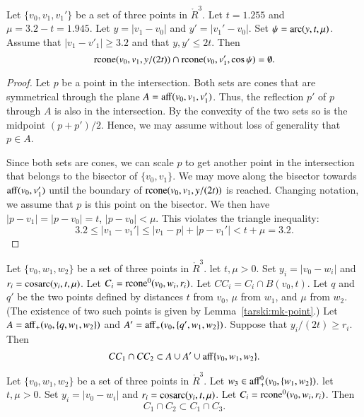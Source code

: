 \newpage


\begin{lemma}\label{tarski:2CCrad}
Let $\{v_0,v_1,v_1'\}$ be a set of three points in $\ring{R}^3$.
Let $t=1.255$ and 
$\mu = 3.2 - t = 1.945$.  Let $y = |v_1-v_0|$ and $y'=|v_1'-v_0|$.
Set $\psi = \operatorname{arc}(y,t,\mu)$.
Assume that $|v_1-v'_1|\ge 3.2$ and that $y,y'\le 2t$.
Then 
   $$
   {\operatorname{rcone}}(v_0,v_1,y/(2t))\cap {\operatorname{rcone}}(v_0,v_1',\cos\psi)
   =\emptyset.
   $$
\end{lemma}


\begin{proof}
Let $p$ be a point in the intersection.  Both sets are cones
that are symmetrical through the plane $A={\operatorname{aff}}(v_0,v_1,v_1')$.
Thus, the reflection $p'$ of $p$ through $A$ is also
in the intersection.  By the convexity of the two sets so is
the midpoint $(p+p')/2$.  Hence, we may assume without loss of
generality that $p\in A$.

Since both sets are cones,
we can scale $p$ to get another point in the intersection  
that belongs to the bisector of $\{v_0,v_1\}$.  We may
move along the bisector towards ${\operatorname{aff}}(v_0,v_1')$ until
the boundary of ${\operatorname{rcone}}(v_0,v_1,y/(2t))$ is reached.
Changing notation,
we assume that $p$ is this point on the bisector.
We then have $|p-v_1|=|p-v_0|=t$, $|p-v_0|< \mu$.
This violates the triangle inequality:
  $$
  3.2\le |v_1-v_1'| \le |v_1-p| + |p-v_1'| < t + \mu = 3.2. 
  $$
\end{proof}

\newpage

\begin{lemma}\label{tarski:AA'}
Let $\{v_0,w_1,w_2\}$ be a set of three points in $\ring{R}^3$.
let $t,\mu > 0$.  Set $y_i=|v_0-w_i|$
and $r_i={\operatorname{cosarc}}(y_i,t,\mu)$.
Let $C_i={\operatorname{rcone}}^0(v_0,w_i,r_i)$.
Let $CC_i = C_i\cap %
    B(v_0,t)$.
Let $q$ and $q'$ be the two points defined by distances
$t$ from $v_0$, $\mu$ from $w_1$, and $\mu$ from $w_2$.
(The existence of two such points is given by Lemma~\ref{tarski:mk-point}.)
Let $A={\operatorname{aff}}_+(v_0,\{q,w_1,w_2\})$ and
$A'={\operatorname{aff}}_+(v_0,\{q',w_1,w_2\})$.
Suppose that $y_i/(2t) \ge r_i$.
Then $$CC_1\cap CC_2 \subset A\cup A'\cup
      {\operatorname{aff}}\{v_0,w_1,w_2\}.$$
\end{lemma}

\newpage

\begin{lemma}\label{tarski:rcone2}
Let $\{v_0,w_1,w_2\}$ be a set of three points in $\ring{R}^3$.
Let $w_3 \in {\operatorname{aff}}_+^0(v_0,\{w_1,w_2\})$.
let $t,\mu > 0$.  Set $y_i=|v_0-w_i|$
and $r_i={\operatorname{cosarc}}(y_i,t,\mu)$.
Let $C_i={\operatorname{rcone}}^0(v_0,w_i,r_i)$.
Then
  $$
  C_1 \cap C_2 \subset C_1 \cap C_3.
  $$
\end{lemma}


